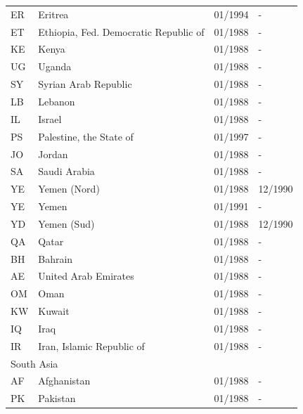\begin{small}
\begin{longtable}{p{0.5cm}p{9cm}p{2cm}p{2cm}}
ER	&	Eritrea	&	01/1994	&	-	\\

ET	&	Ethiopia, Fed. Democratic Republic of	&	01/1988	&	-	\\

KE	&	Kenya	&	01/1988	&	-	\\

UG	&	Uganda	&	01/1988	&	-	\\

SY	&	Syrian Arab Republic	&	01/1988	&	-	\\

LB	&	Lebanon	&	01/1988	&	-	\\

IL	&	Israel	&	01/1988	&	-	\\

PS	&	Palestine, the State of	&	01/1997	&	-	\\

JO	&	Jordan	&	01/1988	&	-	\\

SA	&	Saudi Arabia	&	01/1988	&	-	\\

YE	&	Yemen (Nord)	&	01/1988	&	12/1990	\\

YE	&	Yemen	&	01/1991	&	-	\\

YD	&	Yemen (Sud)	&	01/1988	&	12/1990	\\

QA	&	Qatar	&	01/1988	&	-	\\

BH	&	Bahrain	&	01/1988	&	-	\\

AE	&	United Arab Emirates	&	01/1988	&	-	\\

OM	&	Oman	&	01/1988	&	-	\\

KW	&	Kuwait	&	01/1988	&	-	\\

IQ	&	Iraq	&	01/1988	&	-	\\

IR	&	Iran, Islamic Republic of	&	01/1988	&	-	\\

\midrule
\multicolumn{3}{l}{South Asia}	&	\\
AF	&	Afghanistan	&	01/1988	&	-	\\

PK	&	Pakistan	&	01/1988	&	-	\\


\end{longtable}
\end{small}
